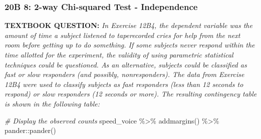 \documentclass[
]{article}
\newenvironment{Shaded}{\begin{snugshade}}{\end{snugshade}}
\newcommand{\CommentTok}[1]{\textcolor[rgb]{0.56,0.35,0.01}{\textit{#1}}}
\newcommand{\FunctionTok}[1]{\textcolor[rgb]{0.00,0.00,0.00}{#1}}
\newcommand{\NormalTok}[1]{#1}
\newcommand{\SpecialCharTok}[1]{\textcolor[rgb]{0.00,0.00,0.00}{#1}}
\begin{document}
\hypertarget{b-8-2-way-chi-squared-test---independence}{%
\subsubsection{20B 8: 2-way Chi-squared Test -
Independence}\label{b-8-2-way-chi-squared-test---independence}}

\textbf{TEXTBOOK QUESTION:} \emph{In Exercise 12B4, the dependent
variable was the amount of time a subject listened to taperecorded cries
for help from the next room before getting up to do something. If some
subjects never respond within the time allotted for the experiment, the
validity of using parametric statistical techniques could be questioned.
As an alternative, subjects could be classified as fast or slow
responders (and possibly, nonresponders). The data from Exercise 12B4
were used to classify subjects as fast responders (less than 12 seconds
to respond) or slow responders (12 seconds or more). The resulting
contingency table is shown in the following table:}

\begin{Shaded}
\begin{Highlighting}[]
\CommentTok{\# Display the observed counts}
\NormalTok{speed\_voice }\SpecialCharTok{\%\textgreater{}\%} 
  \FunctionTok{addmargins}\NormalTok{() }\SpecialCharTok{\%\textgreater{}\%} 
\NormalTok{  pander}\SpecialCharTok{::}\FunctionTok{pander}\NormalTok{()}
\end{Highlighting}
\end{Shaded}
\end{document}
